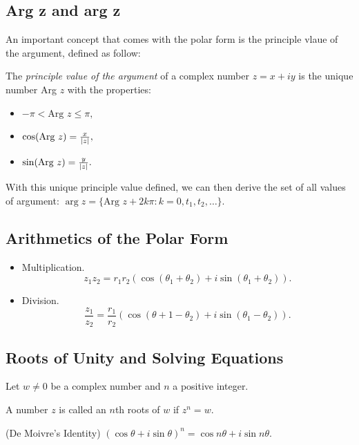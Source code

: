 \documentclass[11pt,reqno,oneside,a4paper]{article}
\begin{document}
\subsection{Arg z and arg z} An important concept that comes with the polar form is the principle vlaue of the argument, defined as follow:
\begin{defn}
	The \textit{principle value of the argument} of a complex number $z = x+iy$ is the unique number Arg $z$ with the properties: 
	
	\begin{itemize}
		\item $-\pi < \text{Arg }z \leq \pi,$
		\item $\cos(\text{Arg }z) = \frac{x}{\left\lvert z\right\rvert},$
		\item $\sin(\text{Arg }z) = \frac{y}{\left\lvert z\right\rvert}.$
	\end{itemize}
	With this unique principle value defined, we can then derive the set of all values of argument: $\arg z = \{\text{Arg }z + 2k\pi: k = 0, t_1, t_2,\dots\}.$
	
\end{defn}

\subsection{Arithmetics of the Polar Form}
\begin{itemize}
	\item Multiplication.
	$$z_1 z_2 = r_1 r_2 (\cos(\theta_1 +\theta_2) + i\sin(\theta_1 +\theta_2)).$$
	
	\item Division.
	$$\frac{z_1}{z_2} = \frac{r_1}{r_2} (\cos(\theta+1 - \theta_2) + i\sin(\theta_1-\theta_2)).$$
\end{itemize}

\subsection{Roots of Unity and Solving Equations}

\begin{defn}
	Let $w\neq 0$ be a complex number and $n$ a positive integer. 
	
	A number $z$ is called an $n$th roots of $w$ if $z^n = w$. 
\end{defn}

\begin{prop}
	(De Moivre's Identity) $(\cos \theta +i\sin \theta)^n = \cos n \theta + i\sin n \theta$.
\end{prop}
\end{document}
